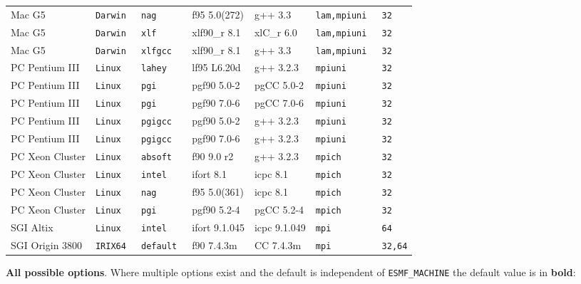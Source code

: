 \begin{tabular}{lllllll}
Mac G5          &\tt Darwin &\tt nag     & f95 \footnotesize 5.0(272)& g++ \footnotesize 3.3    &\tt lam,mpiuni &\tt 32 \\
Mac G5          &\tt Darwin &\tt xlf     & xlf90\_r \footnotesize 8.1& xlC\_r \footnotesize 6.0 &\tt lam,mpiuni &\tt 32 \\
Mac G5          &\tt Darwin &\tt xlfgcc  & xlf90\_r \footnotesize 8.1& g++ \footnotesize 3.3    &\tt lam,mpiuni &\tt 32 \\
PC Pentium III  &\tt Linux  &\tt lahey   & lf95 \footnotesize L6.20d & g++ \footnotesize 3.2.3  &\tt mpiuni     &\tt 32 \\
PC Pentium III  &\tt Linux  &\tt pgi     & pgf90 \footnotesize 5.0-2 & pgCC \footnotesize 5.0-2 &\tt mpiuni     &\tt 32 \\
PC Pentium III  &\tt Linux  &\tt pgi     & pgf90 \footnotesize 7.0-6 & pgCC \footnotesize 7.0-6 &\tt mpiuni     &\tt 32 \\
PC Pentium III  &\tt Linux  &\tt pgigcc  & pgf90 \footnotesize 5.0-2 & g++ \footnotesize 3.2.3  &\tt mpiuni     &\tt 32 \\
PC Pentium III  &\tt Linux  &\tt pgigcc  & pgf90 \footnotesize 7.0-6 & g++ \footnotesize 3.2.3  &\tt mpiuni     &\tt 32 \\
PC Xeon Cluster &\tt Linux  &\tt absoft  & f90 \footnotesize 9.0 r2  & g++ \footnotesize 3.2.3  &\tt mpich      &\tt 32 \\
PC Xeon Cluster &\tt Linux  &\tt intel   & ifort \footnotesize 8.1   & icpc \footnotesize 8.1   &\tt mpich      &\tt 32 \\
PC Xeon Cluster &\tt Linux  &\tt nag     & f95 \footnotesize 5.0(361)& icpc \footnotesize 8.1   &\tt mpich      &\tt 32 \\
PC Xeon Cluster &\tt Linux  &\tt pgi     & pgf90 \footnotesize 5.2-4 & pgCC \footnotesize 5.2-4 &\tt mpich      &\tt 32 \\
SGI Altix       &\tt Linux  &\tt intel   & ifort \footnotesize 9.1.045 & icpc \footnotesize 9.1.049 &\tt mpi    &\tt 64 \\
SGI Origin 3800 &\tt IRIX64 &\tt default & f90 \footnotesize 7.4.3m  & CC \footnotesize 7.4.3m  &\tt mpi        &\tt 32,64
\end{tabular}

\vspace{1ex}

{\bf All possible options}. Where multiple options exist 
and the default is independent of {\tt ESMF\_MACHINE} the default value is in {\bf bold}:

